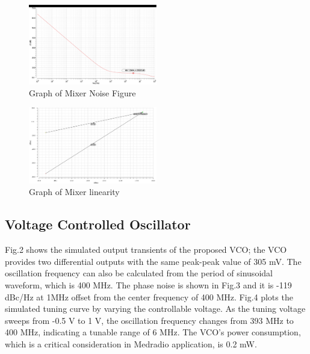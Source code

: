 \begin{figure}[h]
   \centering
    \includegraphics[width=0.5\textwidth]{figures/MixerNoiseFigure.pdf}
    \caption{Graph of Mixer Noise Figure}
    \label{fig:mixernoise}
\end{figure}

\begin{figure}[h]
   \centering
    \includegraphics[width=0.5\textwidth]{figures/mixerIIP3.png}
    \caption{Graph of Mixer linearity}
    \label{fig:mixerlin}
\end{figure}

\subsection{Voltage Controlled Oscillator}
Fig.2 shows the simulated output transients of the proposed VCO; the VCO provides two differential outputs with the same peak-peak value of 305 mV. The oscillation frequency can also be calculated from the period of sinusoidal waveform, which is 400 MHz. The phase noise is shown in Fig.3 and it is -119 dBc/Hz at 1MHz offset from the center frequency of 400 MHz. Fig.4 plots the simulated tuning curve by varying the controllable voltage. As the tuning voltage sweeps from -0.5 V to 1 V, the oscillation frequency changes from 393 MHz to 400 MHz, indicating a tunable range of 6 MHz. The VCO’s power consumption, which is a critical consideration in Medradio application, is 0.2 mW.